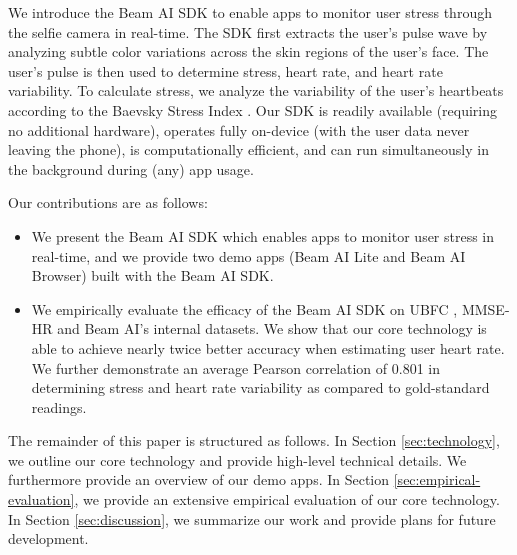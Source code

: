 \documentclass{article}
\begin{document}
We introduce the Beam AI SDK to enable apps to monitor user stress through the selfie camera in real-time. The SDK first extracts the user’s pulse wave by analyzing subtle color variations across the skin regions of the user’s face. The user’s pulse is then used to determine stress, heart rate, and heart rate variability. To calculate stress, we analyze the variability of the user's heartbeats according to the Baevsky Stress Index \cite{BaevskyStressIndex, Kim18_StressHRV}. Our SDK is readily available (requiring no additional hardware), operates fully on-device (with the user data never leaving the phone), is computationally efficient, and can run simultaneously in the background during (any) app usage.

Our contributions are as follows:
\begin{itemize}
    \item We present the Beam AI SDK which enables apps to monitor user stress in real-time, and we provide two demo apps (Beam AI Lite and Beam AI Browser) built with the Beam AI SDK.
    \item We empirically evaluate the efficacy of the Beam AI SDK on UBFC \cite{Bobbia17_UBFC}, MMSE-HR \cite{Zhang16_MMSE} and Beam AI's internal datasets. We show that our core technology is able to achieve nearly twice better accuracy when estimating user heart rate. We further demonstrate an average Pearson correlation of 0.801 in determining stress and heart rate variability as compared to gold-standard readings.
\end{itemize}

The remainder of this paper is structured as follows. In Section \ref{sec:technology}, we outline our core technology and provide high-level technical details. We furthermore provide an overview of our demo apps. In Section \ref{sec:empirical-evaluation}, we provide an extensive empirical evaluation of our core technology. In Section \ref{sec:discussion}, we summarize our work and provide plans for future development.
\end{document}
